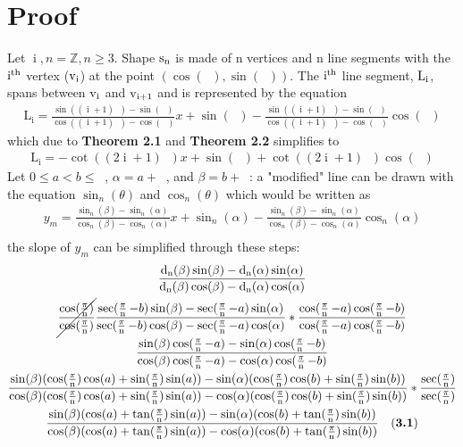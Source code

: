 \documentclass[11pt]{article}
\DeclareMathOperator{\custd}{\mathrm{d}_n}
\DeclareMathOperator{\custi}{\mathrm{i}}
\DeclareMathOperator{\period}{\frac{2\pi}{n}}
\DeclareMathOperator{\hp}{\frac{\pi}{n}}
\DeclareMathOperator{\iperiod}{\custi\frac{2\pi}{n}}
\begin{document}
\section{Proof}
Let \(\custi,n=\mathbb{Z},n\geq3\). Shape \(\rm s_n\) is made of n vertices and n line segments with the \(\rm i^{th}\) vertex (\(\rm v_i\)) at the point \((\cos(\iperiod), \sin(\iperiod))\). The \(\rm i^{th}\) line segment, \(\rm L_i\), spans between \(\rm v_i\) and \(\rm v_{i+1}\) and is represented by the equation
\begin{gather*}
\mathrm{L_i}=\frac{\sin((\custi+1)\period)-\sin(\iperiod)}{\cos((\custi+1)\period)-\cos(\iperiod)}x+\sin(\iperiod)-\frac{\sin((\custi+1)\period)-\sin(\iperiod)}{\cos((\custi+1)\period)-\cos(\iperiod)}\cos(\iperiod)
\end{gather*}
which due to \textbf{Theorem 2.1} and \textbf{Theorem 2.2} simplifies to
\begin{gather*}
\mathrm{L_i}=-\cot((2\custi+1)\hp)x+\sin(\iperiod)+\cot((2\custi+1)\hp)\cos(\iperiod)
\end{gather*}
Let \(0\leq a<b\leq\period\), \(\alpha=a+\iperiod\), and \(\beta=b+\iperiod\): a "modified" line can be drawn with the equation \(\sin_n(\theta)\) and \(\cos_n(\theta)\) which would be written as
\begin{gather*}
y_m=\frac{\sin_n(\beta)-\sin_n(\alpha)}{\cos_n(\beta)-\cos_n(\alpha)}x+\sin_n(\alpha)-\frac{\sin_n(\beta)-\sin_n(\alpha)}{\cos_n(\beta)-\cos_n(\alpha)}\cos_n(\alpha)\\
\end{gather*}
the slope of \(y_m\) can be simplified through these steps:
\begin{gather*}
\frac{\custd(\beta)\sin(\beta)-\custd(\alpha)\sin(\alpha)}{\custd(\beta)\cos(\beta)-\custd(\alpha)\cos(\alpha)}\\
\cancel{\frac{\cos(\hp)}{\cos(\hp)}}\frac{\sec(\hp-b)\sin(\beta)-\sec(\hp-a)\sin(\alpha)}{\sec(\hp-b)\cos(\beta)-\sec(\hp-a)\cos(\alpha)}*\frac{\cos(\hp-a)\cos(\hp-b)}{\cos(\hp-a)\cos(\hp-b)}\\
\frac{\sin(\beta)\cos(\hp-a)-\sin(\alpha)\cos(\hp-b)}{\cos(\beta)\cos(\hp-a)-\cos(\alpha)\cos(\hp-b)}\\
\frac{\sin(\beta)(\cos(\hp)\cos(a)+\sin(\hp)\sin(a))-\sin(\alpha)(\cos(\hp)\cos(b)+\sin(\hp)\sin(b))}{\cos(\beta)(\cos(\hp)\cos(a)+\sin(\hp)\sin(a))-\cos(\alpha)(\cos(\hp)\cos(b)+\sin(\hp)\sin(b))}*\frac{\sec(\hp)}{\sec(\hp)}\\
\frac{\sin(\beta)(\cos(a)+\tan(\hp)\sin(a))-\sin(\alpha)(\cos(b)+\tan(\hp)\sin(b))}{\cos(\beta)(\cos(a)+\tan(\hp)\sin(a))-\cos(\alpha)(\cos(b)+\tan(\hp)\sin(b))} \quad\mathrm{(\textbf{3.1})}
\end{gather*}
\end{document}
